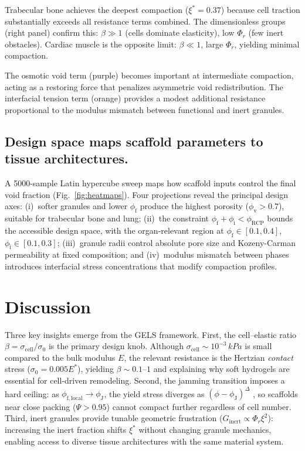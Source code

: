 \documentclass[9pt,twocolumn,twoside]{pnas-new}
\newcommand{\phif}{\phi_\mathrm{f}}
\newcommand{\phii}{\phi_\mathrm{i}}
\newcommand{\phiv}{\phi_\mathrm{v}}
\newcommand{\phiRCP}{\phi_\mathrm{RCP}}
\newcommand{\phiJ}{\phi_\mathrm{J}}
\newcommand{\xistar}{\xi^{*}}
\newcommand{\sigmacell}{\sigma_\mathrm{cell}}
\newcommand{\sigmazero}{\sigma_0}
\newcommand{\kPa}{\,\si{kPa}}
\begin{document}
Trabecular bone achieves the deepest compaction ($\xistar = 0.37$) because
cell traction substantially exceeds all resistance terms combined. The
dimensionless groups (right panel) confirm this: $\beta \gg 1$ (cells
dominate elasticity), low $\Phi_r$ (few inert obstacles). Cardiac muscle is
the opposite limit: $\beta \ll 1$, large $\Phi_r$, yielding minimal
compaction.

The osmotic void term (purple) becomes important at intermediate compaction,
acting as a restoring force that penalizes asymmetric void redistribution.
The interfacial tension term (orange) provides a modest additional resistance
proportional to the modulus mismatch between functional and inert granules.

\subsection*{Design space maps scaffold parameters to tissue architectures.}

A 5000-sample Latin hypercube sweep maps how scaffold inputs control the
final void fraction (Fig.~\ref{fig:heatmaps}). Four projections reveal the
principal design axes: (i)~softer granules and lower $\phif$ produce the
highest porosity ($\phiv > 0.7$), suitable for trabecular bone and lung;
(ii)~the constraint $\phif + \phii < \phiRCP$ bounds the accessible design
space, with the organ-relevant region at $\phif \in [0.1, 0.4]$,
$\phii \in [0.1, 0.3]$; (iii)~granule radii control absolute pore size
and Kozeny-Carman permeability at fixed composition; and (iv)~modulus
mismatch between phases introduces interfacial stress concentrations that
modify compaction profiles.

\section*{Discussion}

Three key insights emerge from the GELS framework.
First, the cell--elastic ratio $\beta = \sigmacell/\sigmazero$ is the
primary design knob. Although $\sigmacell \sim 10^{-3}\kPa$ is small
compared to the bulk modulus $E$, the relevant resistance is the Hertzian
\textit{contact} stress ($\sigmazero = 0.005 E^{*}$), yielding $\beta \sim
0.1$--$1$ and explaining why soft hydrogels are essential for cell-driven
remodeling.
Second, the jamming transition imposes a hard ceiling: as $\phi_\mathrm{f,local}
\to \phiJ$, the yield stress diverges as $(\phi - \phiJ)^\Delta$
\cite{OHern2003,Olsson2012}, so scaffolds near close packing ($\Psi > 0.95$)
cannot compact further regardless of cell number.
Third, inert granules provide tunable geometric frustration ($G_\mathrm{inert}
\propto \Phi_r \xi^2$): increasing the inert fraction shifts $\xistar$
without changing granule mechanics, enabling access to diverse tissue
architectures with the same material system.
\end{document}
